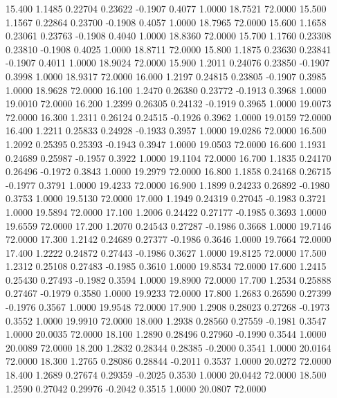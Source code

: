  15.400   1.1485   0.22704   0.23622  -0.1907   0.4077   1.0000  18.7521  72.0000
  15.500   1.1567   0.22864   0.23700  -0.1908   0.4057   1.0000  18.7965  72.0000
  15.600   1.1658   0.23061   0.23763  -0.1908   0.4040   1.0000  18.8360  72.0000
  15.700   1.1760   0.23308   0.23810  -0.1908   0.4025   1.0000  18.8711  72.0000
  15.800   1.1875   0.23630   0.23841  -0.1907   0.4011   1.0000  18.9024  72.0000
  15.900   1.2011   0.24076   0.23850  -0.1907   0.3998   1.0000  18.9317  72.0000
  16.000   1.2197   0.24815   0.23805  -0.1907   0.3985   1.0000  18.9628  72.0000
  16.100   1.2470   0.26380   0.23772  -0.1913   0.3968   1.0000  19.0010  72.0000
  16.200   1.2399   0.26305   0.24132  -0.1919   0.3965   1.0000  19.0073  72.0000
  16.300   1.2311   0.26124   0.24515  -0.1926   0.3962   1.0000  19.0159  72.0000
  16.400   1.2211   0.25833   0.24928  -0.1933   0.3957   1.0000  19.0286  72.0000
  16.500   1.2092   0.25395   0.25393  -0.1943   0.3947   1.0000  19.0503  72.0000
  16.600   1.1931   0.24689   0.25987  -0.1957   0.3922   1.0000  19.1104  72.0000
  16.700   1.1835   0.24170   0.26496  -0.1972   0.3843   1.0000  19.2979  72.0000
  16.800   1.1858   0.24168   0.26715  -0.1977   0.3791   1.0000  19.4233  72.0000
  16.900   1.1899   0.24233   0.26892  -0.1980   0.3753   1.0000  19.5130  72.0000
  17.000   1.1949   0.24319   0.27045  -0.1983   0.3721   1.0000  19.5894  72.0000
  17.100   1.2006   0.24422   0.27177  -0.1985   0.3693   1.0000  19.6559  72.0000
  17.200   1.2070   0.24543   0.27287  -0.1986   0.3668   1.0000  19.7146  72.0000
  17.300   1.2142   0.24689   0.27377  -0.1986   0.3646   1.0000  19.7664  72.0000
  17.400   1.2222   0.24872   0.27443  -0.1986   0.3627   1.0000  19.8125  72.0000
  17.500   1.2312   0.25108   0.27483  -0.1985   0.3610   1.0000  19.8534  72.0000
  17.600   1.2415   0.25430   0.27493  -0.1982   0.3594   1.0000  19.8900  72.0000
  17.700   1.2534   0.25888   0.27467  -0.1979   0.3580   1.0000  19.9233  72.0000
  17.800   1.2683   0.26590   0.27399  -0.1976   0.3567   1.0000  19.9548  72.0000
  17.900   1.2908   0.28023   0.27268  -0.1973   0.3552   1.0000  19.9910  72.0000
  18.000   1.2938   0.28560   0.27559  -0.1981   0.3547   1.0000  20.0035  72.0000
  18.100   1.2890   0.28496   0.27960  -0.1990   0.3544   1.0000  20.0089  72.0000
  18.200   1.2832   0.28344   0.28385  -0.2000   0.3541   1.0000  20.0164  72.0000
  18.300   1.2765   0.28086   0.28844  -0.2011   0.3537   1.0000  20.0272  72.0000
  18.400   1.2689   0.27674   0.29359  -0.2025   0.3530   1.0000  20.0442  72.0000
  18.500   1.2590   0.27042   0.29976  -0.2042   0.3515   1.0000  20.0807  72.0000
